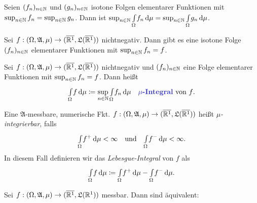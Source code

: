 \documentclass{cheat-sheet}
\newcommand{\Alg}{\mathfrak{A}} %
\newcommand{\LebAlg}{\mathfrak{L}} %
\renewcommand{\ER}{\overline{\R^1}} %
\newcommand{\IntOmu}[1]{\Int{\Omega}{}{#1}{\mu}} %
\begin{document}
\begin{korollar}
  Seien $(f_n)_{n \in \mathbb{N}}$ und $(g_n)_{n \in \mathbb{N}}$ isotone Folgen elementarer Funktionen mit $\sup_{n \in \mathbb{N}} f_n = \sup_{n \in \mathbb{N}} g_n$. Dann ist $\sup_{n \in \N} \IntOmu{f_n} = \sup_{n \in \N} \IntOmu{g_n}$.
\end{korollar}

\begin{satz}
  Sei $f : (\Omega, \Alg, \mu) \to (\ER, \LebAlg(\ER))$ nichtnegativ. Dann gibt es eine isotone Folge $(f_n)_{n \in \mathbb{N}}$ elementarer Funktionen mit $\sup_{n \in \mathbb{N}} f_n = f$.
\end{satz}

\begin{defn}
  Sei $f : (\Omega, \Alg, \mu) \to (\ER, \LebAlg(\ER))$ nichtnegativ und $(f_n)_{n \in \mathbb{N}}$ eine Folge elementarer Funktionen mit $\sup_{n \in \mathbb{N}} f_n = f$. Dann heißt
  \[ \IntOmu{f} \coloneqq \sup_{n \in \N} \IntOmu{f_n} \quad \text{\emph{$\mu$-Integral} von $f$.} \]
\end{defn}


\begin{defn}
  Eine $\Alg$-messbare, numerische Fkt. $f : (\Omega, \Alg, \mu) \to (\ER, \LebAlg(\ER))$ heißt \emph{$\mu$-integrierbar}, falls
  \[ \IntOmu{f^+} < \infty \quad \text{und} \quad \IntOmu{f^-} < \infty. \]
  In diesem Fall definieren wir das \emph{Lebesgue-Integral} von $f$ als
  \[ \IntOmu{f} \coloneqq \IntOmu{f^+} - \IntOmu{f^-}. \]
\end{defn}



\begin{satz}
  Sei $f : (\Omega, \Alg, \mu) \to (\ER, \LebAlg(\R^1))$ messbar. Dann sind äquivalent:
  \begin{itemize}
  \end{itemize}
\end{satz}

\end{document}
